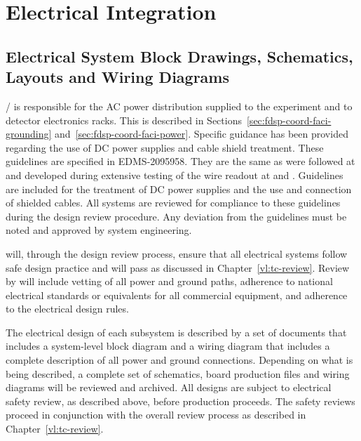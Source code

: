 

\section{Electrical Integration}
\label{sec:fdsp-Integ-electrical}


\subsection{Electrical System Block Drawings, Schematics, Layouts and Wiring Diagrams}
\label{sec:fdsp-coord-electrical}


/ is responsible for the AC power distribution supplied to
the experiment and to detector electronics racks.  This is described
in Sections~\ref{sec:fdsp-coord-faci-grounding}
and~\ref{sec:fdsp-coord-faci-power}.  Specific guidance has been
provided regarding the use of DC power supplies and cable shield
treatment.  These guidelines are specified in
EDMS-2095958\cite{bib:cernedms2095958}. They are the same as were
followed at  and developed during extensive testing
of the  wire readout at  and .
Guidelines are included for the treatment of DC power supplies and the
use and connection of shielded cables.  All systems are reviewed for
compliance to these guidelines during the design review procedure.
Any deviation from the guidelines must be noted and approved by system
engineering.

 will, through the design review process, ensure
that all electrical systems  follow safe design practice and
will pass  as discussed in Chapter~\ref{vl:tc-review}.  
Review by  will include
vetting of all power and ground paths, adherence to national
electrical standards or equivalents for all commercial equipment, and
adherence to the  electrical design rules.

The electrical design of each subsystem is described by a set of
documents that includes a system-level block diagram and a wiring
diagram that includes a complete description of all power and ground
connections.  Depending on what is being described, a complete set of
schematics, board production files and wiring diagrams will be
reviewed and archived.  All designs are subject to electrical safety
review, as described above, before production proceeds. The safety
reviews proceed in conjunction with the overall review process as
described in Chapter~\ref{vl:tc-review}.

